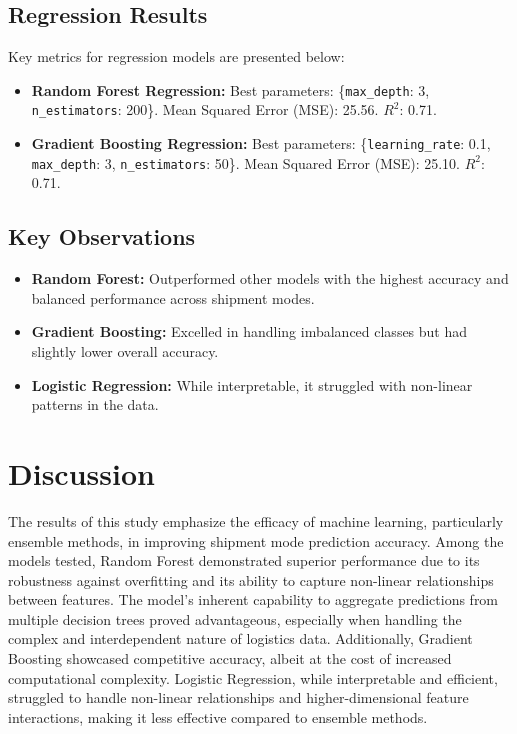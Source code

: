 \documentclass[conference]{IEEEtran}
\begin{document}
\subsection{Regression Results}
Key metrics for regression models are presented below:
\begin{itemize}
    \item \textbf{Random Forest Regression:} Best parameters: \{\texttt{max\_depth}: 3, \texttt{n\_estimators}: 200\}. Mean Squared Error (MSE): 25.56. $R^2$: 0.71.
    \item \textbf{Gradient Boosting Regression:} Best parameters: \{\texttt{learning\_rate}: 0.1, \texttt{max\_depth}: 3, \texttt{n\_estimators}: 50\}. Mean Squared Error (MSE): 25.10. $R^2$: 0.71.
\end{itemize}

\subsection{Key Observations}
\begin{itemize}
    \item \textbf{Random Forest:} Outperformed other models with the highest accuracy and balanced performance across shipment modes.
    \item \textbf{Gradient Boosting:} Excelled in handling imbalanced classes but had slightly lower overall accuracy.
    \item \textbf{Logistic Regression:} While interpretable, it struggled with non-linear patterns in the data.
\end{itemize}

\section{Discussion}
The results of this study emphasize the efficacy of machine learning, particularly ensemble methods, in improving shipment mode prediction accuracy. Among the models tested, Random Forest demonstrated superior performance due to its robustness against overfitting and its ability to capture non-linear relationships between features. The model's inherent capability to aggregate predictions from multiple decision trees proved advantageous, especially when handling the complex and interdependent nature of logistics data. Additionally, Gradient Boosting showcased competitive accuracy, albeit at the cost of increased computational complexity. Logistic Regression, while interpretable and efficient, struggled to handle non-linear relationships and higher-dimensional feature interactions, making it less effective compared to ensemble methods.
\end{document}
